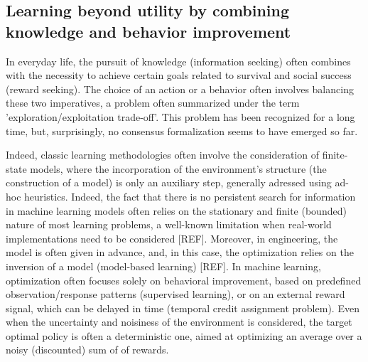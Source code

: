 \documentclass[10pt,letterpaper]{article}
\begin{document}











 





\subsection{Learning beyond utility by combining knowledge and behavior improvement}

In everyday life, the pursuit of knowledge (information seeking) often combines with the necessity to achieve certain goals related to survival and social success (reward seeking). The choice of an action or a behavior often involves balancing these two imperatives, a problem often summarized under the term 'exploration/exploitation trade-off'. This problem has been recognized for a long time, but, surprisingly, no consensus formalization seems to have emerged so far.

Indeed, classic learning methodologies often involve the consideration of finite-state models, where the incorporation of the environment's structure (the construction of a model) is only an auxiliary step, generally adressed using ad-hoc heuristics. Indeed, the fact that there is no persistent search for information in machine learning models often relies on the stationary and finite (bounded) nature of most learning problems, a well-known limitation when real-world implementations need to be considered [REF]. Moreover, in engineering, the model is often given in advance, and, in this case, the optimization relies on the inversion of a model (model-based learning) [REF]. In machine learning, optimization often focuses solely on behavioral improvement, based on predefined observation/response patterns (supervised learning), or on an external reward signal, which can be delayed in time (temporal credit assignment problem). Even when the  uncertainty and noisiness of the environment is considered, the target optimal policy is often a deterministic one, aimed at optimizing an average over a noisy (discounted) sum of of rewards.
\end{document}
